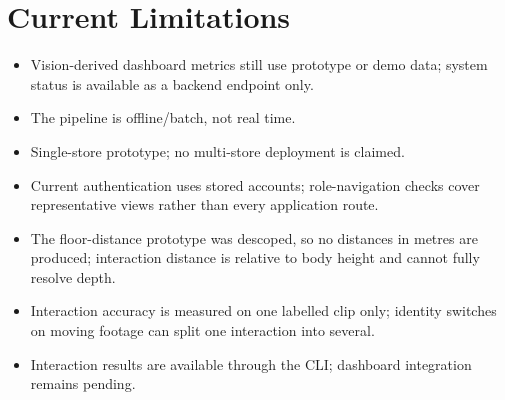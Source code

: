 \section{Current Limitations}
\begin{itemize}
\item Vision-derived dashboard metrics still use prototype or demo data; system status is available as a backend endpoint only.
\item The pipeline is offline/batch, not real time.
\item Single-store prototype; no multi-store deployment is claimed.
\item Current authentication uses stored accounts; role-navigation checks cover representative views rather than every application route.
\item The floor-distance prototype was descoped, so no distances in metres are produced; interaction distance is relative to body height and cannot fully resolve depth.
\item Interaction accuracy is measured on one labelled clip only; identity switches on moving footage can split one interaction into several.
\item Interaction results are available through the CLI; dashboard integration remains pending.
\end{itemize}
